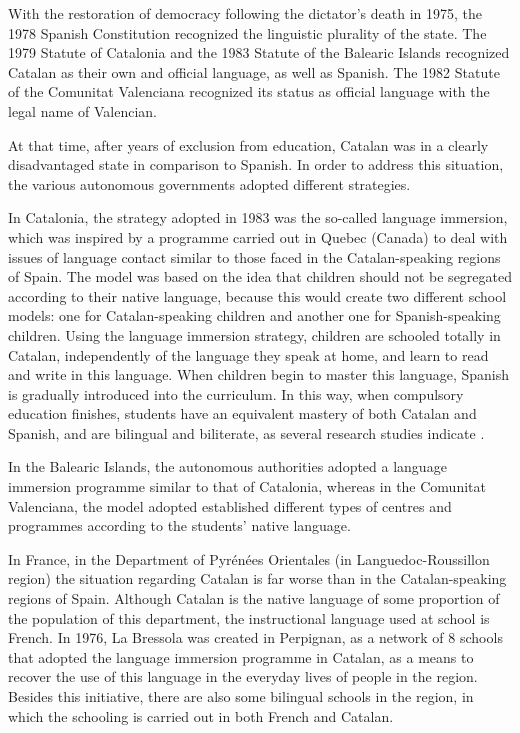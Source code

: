 \documentclass[]{../../metanetpaper}
\begin{document}
\begin{multicols}{2}
With the restoration of democracy following the dictator's death in 1975, the 1978 Spanish Constitution recognized the linguistic plurality of the state. The 1979 Statute of Catalonia and the 1983 Statute of the Balearic Islands recognized Catalan as their own and official language, as well as Spanish. The 1982 Statute of the Comunitat Valenciana recognized its status as official language with the legal name of Valencian.

At that time, after years of exclusion from education, Catalan was in a clearly disadvantaged state in comparison to Spanish. In order to address this situation, the various autonomous governments adopted different strategies.

In Catalonia, the strategy adopted in 1983 was the so-called language immersion, which was inspired by a programme carried out in Quebec (Canada) to deal with issues of language contact similar to those faced in the Catalan-speaking regions of Spain. The model was based on the idea that children should not be segregated according to their native language, because this would create two different school models: one for Catalan-speaking children and another one for Spanish-speaking children. Using the language immersion strategy, children are schooled totally in Catalan, independently of the language they speak at home, and learn to read and write in this language. When children begin to master this language, Spanish is gradually introduced into the curriculum. In this way, when compulsory education finishes, students have an equivalent mastery of both Catalan and Spanish, and are bilingual and biliterate, as several research studies indicate \cite{CAT-Nota5}.

In the Balearic Islands, the autonomous authorities adopted a language immersion programme similar to that of Catalonia, whereas in the Comunitat Valenciana, the model adopted established different types of centres and programmes according to the students' native language.

In France, in the Department of Pyrénées Orientales (in Languedoc-Roussillon region) the situation regarding Catalan is far worse than in the Catalan-speaking regions of Spain. Although Catalan is the native language of some proportion of the population of this department, the instructional language used at school is French. In 1976, La Bressola \cite{CAT-Nota6} was created in Perpignan, as a network of 8 schools that adopted the language immersion programme in Catalan, as a means to recover the use of this language in the everyday lives of people in the region. Besides this initiative, there are also some bilingual schools in the region, in which the schooling is carried out in both French and Catalan.


\end{multicols}
\end{document}
